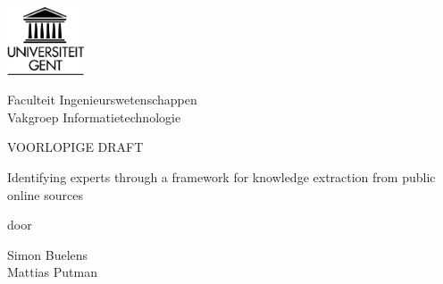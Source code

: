 

\begin{titlepage}

\setlength{\hoffset}{-1in}
\setlength{\voffset}{-1in}
\setlength{\topmargin}{1.5cm}
\setlength{\headheight}{0.5cm}
\setlength{\headsep}{1cm}
\setlength{\oddsidemargin}{3cm}
\setlength{\evensidemargin}{3cm}
\setlength{\footskip}{1.5cm}
\enlargethispage{1cm}

\fontsize{12pt}{14pt}
\selectfont

\begin{center}

\includegraphics[height=2cm]{fig/ruglogo}

\vspace{0.5cm}

Faculteit Ingenieurswetenschappen\\
Vakgroep Informatietechnologie\\


\vspace{1cm}

\fontsize{24pt}{24pt}
\selectfont

VOORLOPIGE DRAFT
\vspace{1cm}

\fontsize{17.28pt}{21pt}
\selectfont


Identifying experts through a framework for knowledge extraction from public online sources
\fontsize{12pt}{14pt}
\selectfont

\vspace{.5cm}

door 

\vspace{.4cm}

Simon Buelens\\
Mattias Putman

\vspace{2.5cm}


\end{center}
\end{titlepage}
